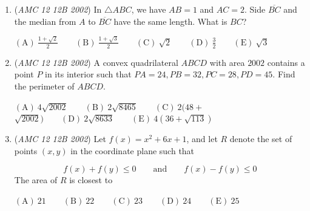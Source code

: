 \begin{enumerate}
	\item (\textit{AMC 12 12B 2002}) In $\triangle ABC$, we have $AB = 1$ and $AC = 2$. Side $\overline{BC}$ and the median from $A$ to $\overline{BC}$ have the same length. What is $BC$?


 $\mathrm{(A)}\ \frac{1+\sqrt{2}}{2} \qquad\mathrm{(B)}\ \frac{1+\sqrt{3}}2 \qquad\mathrm{(C)}\ \sqrt{2} \qquad\mathrm{(D)}\ \frac 32 \qquad\mathrm{(E)}\ \sqrt{3}$


	\item (\textit{AMC 12 12B 2002}) A convex quadrilateral $ABCD$ with area $2002$ contains a point $P$ in its interior such that $PA = 24, PB = 32, PC = 28, PD = 45$. Find the perimeter of $ABCD$.


 $\mathrm{(A)}\ 4\sqrt{2002} \qquad\mathrm{(B)}\ 2\sqrt{8465} \qquad\mathrm{(C)}\ 2(48+$ $\sqrt{2002}) \qquad\mathrm{(D)}\ 2\sqrt{8633} \qquad\mathrm{(E)}\ 4(36 + \sqrt{113})$


	\item (\textit{AMC 12 12B 2002}) Let $f(x) = x^2 + 6x + 1$, and let $R$ denote the set of points $(x,y)$ in the coordinate plane such that 

 \[f(x) + f(y) \le 0 \qquad \text{and} \qquad f(x)-f(y) \le 0\]
The area of $R$ is closest to 


 $\mathrm{(A)}\ 21 \qquad\mathrm{(B)}\ 22 \qquad\mathrm{(C)}\ 23 \qquad\mathrm{(D)}\ 24 \qquad\mathrm{(E)}\ 25$


\end{enumerate}